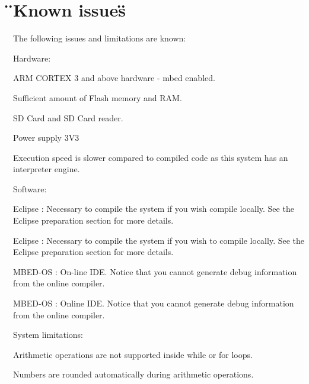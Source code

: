 \chapter{\"{}\+Known issues\"{}}
\hypertarget{04_known_issues}{}\label{04_known_issues}
The following issues and limitations are known\+:


\begin{DoxyItemize}
\item Hardware\+:
\begin{DoxyItemize}
\item ARM CORTEX 3 and above hardware -\/ mbed enabled.
\item Sufficient amount of Flash memory and RAM.
\item SD Card and SD Card reader.
\item Power supply 3V3
\item Execution speed is slower compared to compiled code as this system has an interpreter engine.
\end{DoxyItemize}
\item Software\+:
\begin{DoxyItemize}
\item Eclipse \+: Necessary to compile the system if you wish compile locally. See the Eclipse preparation section for more details.
\item Eclipse \+: Necessary to compile the system if you wish to compile locally. See the Eclipse preparation section for more details.
\item MBED-\/\+OS \+: On-\/line IDE. Notice that you cannot generate debug information from the online compiler.
\item MBED-\/\+OS \+: Online IDE. Notice that you cannot generate debug information from the online compiler.
\end{DoxyItemize}
\item System limitations\+:
\begin{DoxyItemize}
\item Arithmetic operations are not supported inside while or for loops.
\item Numbers are rounded automatically during arithmetic operations. 
\end{DoxyItemize}
\end{DoxyItemize}